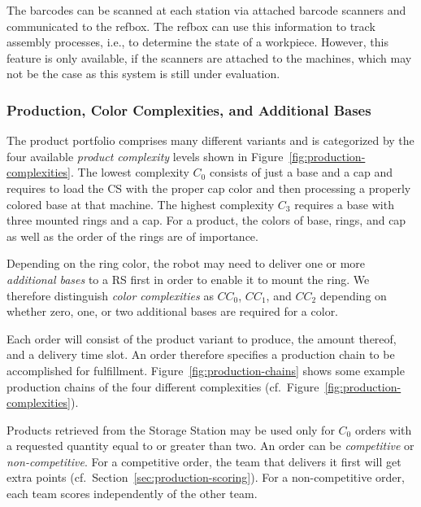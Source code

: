 \documentclass[12pt,twoside]{article}
\newcommand{\refsec}[1]{Section~\ref{#1}}
\newcommand{\reffig}[1]{Figure~\ref{#1}}
\begin{document}
The barcodes can be scanned at each station via attached barcode scanners and
communicated to the \ac{refbox}.
The \ac{refbox} can use this information to track assembly
processes, i.e., to determine the state of a workpiece.
However, this feature is only available, if the scanners are attached
to the machines, which may not be the case as this system is still under
evaluation.

\subsubsection{Production, Color Complexities, and Additional Bases}
\label{sec:production-complexities}
The product portfolio comprises many different variants and is
categorized by the four available \emph{product complexity} levels
shown in \reffig{fig:production-complexities}. The lowest complexity
$C_0$ consists of just a base and a cap and requires to load the \ac{CS}
with the proper cap color and then processing a properly colored base
at that machine. The highest complexity $C_3$ requires a base with
three mounted rings and a cap. For a product, the colors of base,
rings, and cap as well as the order of the rings are of importance.

Depending on the ring color, the robot may need to deliver one or more
\emph{additional bases} to a \ac{RS} first in order to enable it to mount
the ring. We therefore distinguish \emph{color complexities} as $CC_0$, $CC_1$,
and $CC_2$ depending on whether zero, one, or two additional bases are
required for a color.

Each order will consist of the product variant to
produce, the amount thereof, and a delivery time slot. An order
therefore specifies a production chain to be accomplished for
fulfillment. \reffig{fig:production-chains} shows some example
production chains of the four different complexities
(cf.~\reffig{fig:production-complexities}).

Products retrieved from the Storage Station may be used only for
$C_0$ orders with a requested quantity equal to or greater than two.
An order can be \emph{competitive} or \emph{non-competitive}. For a competitive
order, the team that delivers it first will get extra points
(cf.~\refsec{sec:production-scoring}).
For a non-competitive order, each team scores independently of the other team.
\end{document}
